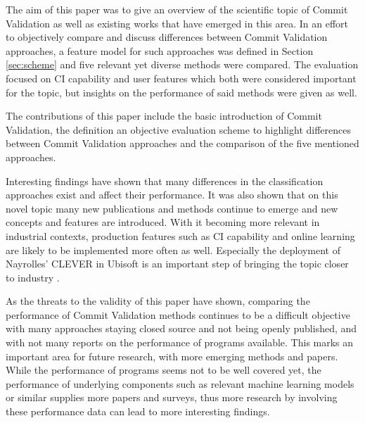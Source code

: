 

The aim of this paper was to give an overview of the scientific topic of Commit Validation as well as existing works that have emerged in this area. In an effort to objectively compare and discuss differences between Commit Validation approaches, a feature model for such approaches was defined in Section \ref{sec:scheme} and five relevant yet diverse methods were compared. The evaluation focused on CI capability and user features which both were considered important for the topic, but insights on the performance of said methods were given as well.

The contributions of this paper include the basic introduction of Commit Validation, the definition an objective evaluation scheme to highlight differences between Commit Validation approaches and the comparison of the five mentioned approaches.

Interesting findings have shown that many differences in the classification approaches exist and affect their performance. It was also shown that on this novel topic many new publications and methods continue to emerge and new concepts and features are introduced. With it becoming more relevant in industrial contexts, production features such as CI capability and online learning are likely to be implemented more often as well. Especially the deployment of Nayrolles' CLEVER in Ubisoft is an important step of bringing the topic closer to industry \cite{Nayrolles2018}.

As the threats to the validity of this paper have shown, comparing the performance of Commit Validation methods continues to be a difficult objective with many approaches staying closed source and not being openly published, and with not many reports on the performance of programs available. This marks an important area for future research, with more emerging methods and papers. While the performance of programs seems not to be well covered yet, the performance of underlying components such as relevant machine learning models or similar supplies more papers and surveys, thus more research by involving these performance data can lead to more interesting findings.
